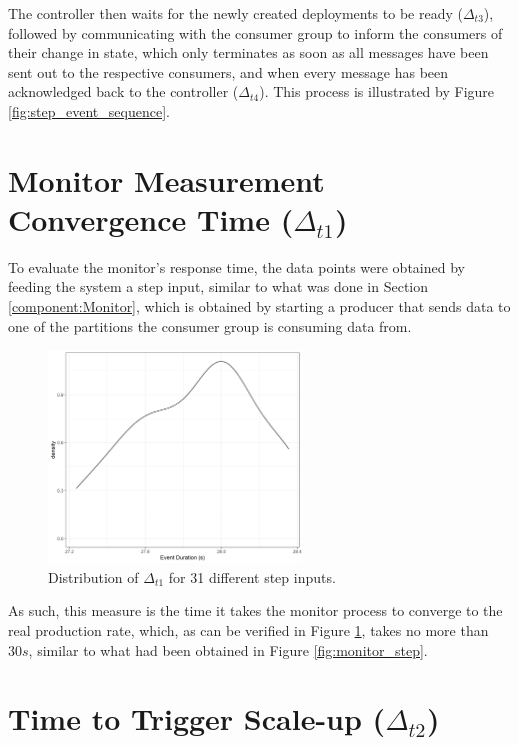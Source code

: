 The controller then waits for the newly created deployments to be ready
($\Delta_{t3}$), followed by communicating with the consumer group to inform the
consumers of their change in state, which only terminates as
soon as all messages have been sent out to the respective consumers, and when every message
has been acknowledged back to the controller ($\Delta_{t4}$). This process is illustrated
by Figure \ref{fig:step_event_sequence}.


\section{Monitor Measurement Convergence Time ($\Delta_{t1}$)}
\label{c3sec:MonitorMeasurement}

To evaluate the monitor's response time, the data points were obtained by
feeding the system a step input, similar to what was done in Section
\ref{component:Monitor}, which is obtained by starting a producer that sends
data to one of the partitions the consumer group is consuming data from.

\begin{figure}[H]
\centering
\includegraphics[width=0.6\textwidth]{images/integration/delta1.png}
\caption{
    Distribution of $\Delta_{t1}$ for 31 different step inputs.
}
\label{fig:controller_result_monitor}
\end{figure}

As such, this measure is the time it takes the monitor process to converge to
the real production rate, which, as can be verified in Figure
\ref{fig:controller_result_monitor}, takes no more than $30s$, similar to what
had been obtained in Figure \ref{fig:monitor_step}.

\section{Time to Trigger Scale-up ($\Delta_{t2}$)}

